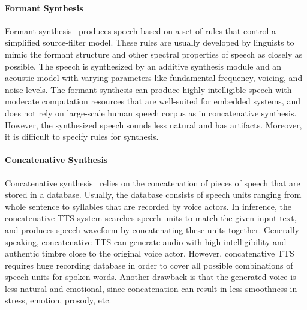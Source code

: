 \documentclass{article}
\begin{document}
\paragraph{Formant Synthesis}
Formant synthesis~\cite{seeviour1976automatic,allen1979mitalk,klatt1980software} produces speech based on a set of rules that control a simplified source-filter model. These rules are usually developed by linguists to mimic the formant structure and other spectral properties of speech as closely as possible. The speech is synthesized by an additive synthesis module and an acoustic model with varying parameters like fundamental frequency, voicing, and noise levels. The formant synthesis can produce highly intelligible speech with moderate computation resources that are well-suited for embedded systems, and does not rely on large-scale human speech corpus as in concatenative synthesis. However, the synthesized speech sounds less natural and has artifacts. Moreover, it is difficult to specify rules for synthesis. 

\paragraph{Concatenative Synthesis}
Concatenative synthesis~\cite{olive1977rule,moulines1990pitch,sagisaka1992atr,hunt1996unit,black1998festival} relies on the concatenation of pieces of speech that are stored in a database. Usually, the database consists of speech units ranging from whole sentence to syllables that are recorded by voice actors. In inference, the concatenative TTS system searches speech units to match the given input text, and produces speech waveform by concatenating these units together. Generally speaking, concatenative TTS can generate audio with high intelligibility and authentic timbre close to the original voice actor. However, concatenative TTS requires huge recording database in order to cover all possible combinations of speech units for spoken words. Another drawback is that the generated voice is less natural and emotional, since concatenation can result in less smoothness in stress, emotion, prosody, etc. 
\end{document}
